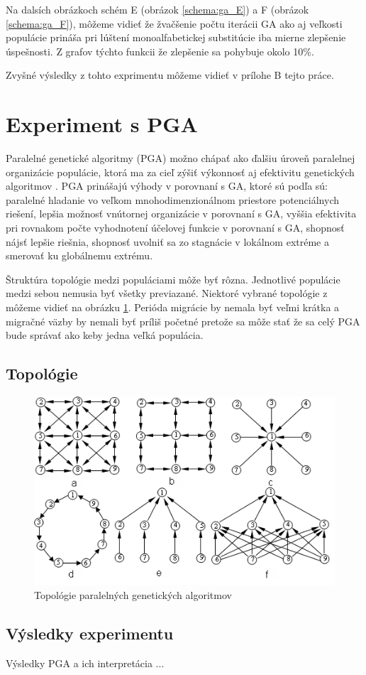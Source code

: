 Na dalsích obrázkoch schém E (obrázok \ref{schema:ga_E}) a F (obrázok \ref{schema:ga_F}), môžeme vidieť že žvačšenie počtu iterácii GA ako aj veľkosti populácie prináša pri lúštení monoalfabetickej substitúcie iba mierne zlepšenie úspešnosti. Z grafov týchto funkcii že zlepšenie sa pohybuje okolo 10\%.



Zvyšné výsledky z tohto exprimentu môžeme vidieť v prílohe B tejto práce.
\section{Experiment s PGA}
Paralelné genetické algoritmy (PGA) možno chápať ako ďalšiu úroveň paralelnej organizácie populácie, ktorá ma za cieľ zýšiť výkonnosť aj efektivitu genetických algoritmov \cite{pea}.
PGA prinášajú výhody v porovnaní s GA, ktoré sú podľa \cite{pea} sú: paralelné hladanie vo veľkom mnohodimenzionálnom priestore potenciálnych riešení, lepšia možnosť vnútornej organizácie v porovnaní s GA, vyššia efektivita pri rovnakom počte vyhodnotení účelovej funkcie v porovnaní s GA, shopnosť nájsť lepšie riešnia, shopnosť uvolniť sa zo stagnácie v lokálnom extréme a smerovať ku globálnemu extrému.

Štruktúra topológie medzi populáciami môže byť rôzna. Jednotlivé populácie medzi sebou nemusia byť všetky previazané.
Niektoré vybrané topológie z \cite{pea} môžeme vidieť na obrázku \ref{img:topology}.
Perióda migrácie by nemala byť veľmi krátka a migračné väzby by nemali byť príliš početné pretože sa môže stať že sa celý PGA bude správať ako keby jedna veľká populácia.

\subsection{Topológie}

\begin{figure}[!htbp]
  \centering
  \includegraphics[width=\textwidth]{img/topology.png}
  \caption{Topológie paralelných genetických algoritmov}
  \label{img:topology}
\end{figure}
\subsection{Výsledky experimentu}
Výsledky PGA a ich interpretácia
...



